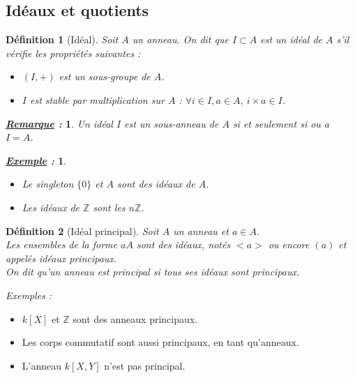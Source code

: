 \documentclass{article}           %
\newcommand\Z{\mathbb{Z}}
\newcommand\tq{\hspace{0.3cm}} 		%
\theoremstyle{break}
\theoremstyle{add}
\theoremstyle{break} %
\newtheorem{definition}{Définition}[section]
\theoremstyle{add}
\newtheorem*{exemple}{\textit{\underline{Exemple} :}}
\newtheorem*{remarque}{\textit{\underline{Remarque} : }}
\newcommand\NL{
\mbox{}
\vspace*{-\parsep}
\vspace*{-\baselineskip}}
\begin{document}
\vspace{0.3cm}
 

\subsection{Idéaux et quotients}

\begin{definition}[Idéal]
Soit $A$ un anneau. On dit que $I \subset A$ est un idéal de $A$ s’il vérifie les propriétés suivantes :

\begin{itemize}
\item $(I, +)$ est un sous-groupe de $A$.
\item $I$ est stable par multiplication sur $A$ : $\forall i \in I, a \in A$, \tq $i \times a \in I$.
\end{itemize}
\end{definition}

\begin{remarque}
Un idéal $I$ est un sous-anneau de $A$ si et seulement si ou a $I=A$.
\end{remarque}

\begin{exemple} \NL
\begin{itemize}
\item Le singleton $\{0\}$ et $A$ sont des idéaux de $A$.
\item Les idéaux de $\Z$ sont les  $n \Z$.
\end{itemize}
\end{exemple}

\begin{definition}[Idéal principal]
Soit $A$ un anneau et $a \in A$. \\
Les ensembles de la forme $aA$ sont des idéaux, notés $<\!a\!>$ ou encore $(a)$ et appelés \textit{idéaux principaux}. \\

On dit qu'un anneau est principal si tous ses idéaux sont principaux.
\end{definition}

\textit{Exemples :}
\begin{itemize}
\item $k[X]$ et $\Z$ sont des anneaux principaux. \\
\item Les corps commutatif sont aussi principaux, en tant qu'anneaux. \\
\item L'anneau $k[X,Y]$ n'est pas principal.
\end{itemize}
\end{document}
